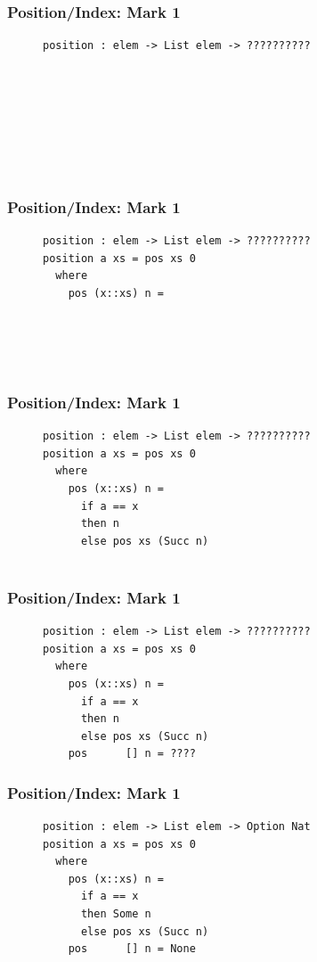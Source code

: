 \documentclass{beamer}
\begin{document}
  \begin{frame}[fragile]
    \frametitle{Position/Index: Mark 1}
    \begin{figure}
    {\color{dark-gray}
      \centering
\begin{BVerbatim}
position : elem -> List elem -> ??????????
                        
       
                   
               
            
                          
                       
\end{BVerbatim}
    }
    \end{figure}
  \end{frame}
  \begin{frame}[fragile]
    \frametitle{Position/Index: Mark 1}
    \begin{figure}
    {\color{dark-gray}
      \centering
\begin{BVerbatim}
position : elem -> List elem -> ??????????
position a xs = pos xs 0
  where
    pos (x::xs) n =
               
            
                          
                       
\end{BVerbatim}
    }
    \end{figure}
  \end{frame}
  \begin{frame}[fragile]
    \frametitle{Position/Index: Mark 1}
    \begin{figure}
    {\color{dark-gray}
      \centering
\begin{BVerbatim}
position : elem -> List elem -> ??????????
position a xs = pos xs 0
  where
    pos (x::xs) n =
      if a == x
      then n
      else pos xs (Succ n)
                       
\end{BVerbatim}
    }
    \end{figure}
  \end{frame}
  \begin{frame}[fragile]
    \frametitle{Position/Index: Mark 1}
    \begin{figure}
    {\color{dark-gray}
      \centering
\begin{BVerbatim}
position : elem -> List elem -> ??????????
position a xs = pos xs 0
  where
    pos (x::xs) n =
      if a == x
      then n
      else pos xs (Succ n)
    pos      [] n = ????
\end{BVerbatim}
    }
    \end{figure}
  \end{frame}
  \begin{frame}[fragile]
    \frametitle{Position/Index: Mark 1}
    \begin{figure}
    {\color{dark-gray}
      \centering
\begin{BVerbatim}
position : elem -> List elem -> Option Nat
position a xs = pos xs 0
  where
    pos (x::xs) n =
      if a == x
      then Some n
      else pos xs (Succ n)
    pos      [] n = None
\end{BVerbatim}
    }
    \end{figure}
  \end{frame}
\end{document}
